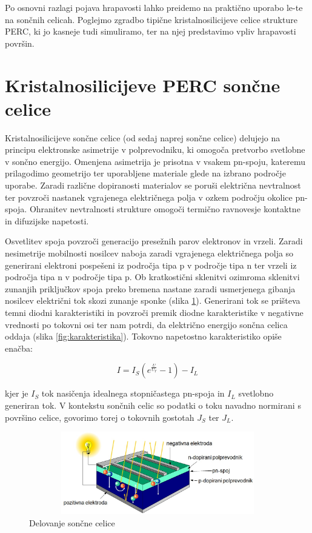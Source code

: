 \documentclass[a4paper,twoside,openright,12pt,slovene]{book}
\begin{document}
Po osnovni razlagi pojava hrapavosti lahko preidemo na praktično uporabo le-te na sončnih celicah. Poglejmo zgradbo tipične kristalnosilicijeve celice strukture PERC, ki jo kasneje tudi simuliramo, ter na njej predstavimo vpliv hrapavosti površin. 


\section{Kristalnosilicijeve PERC sončne celice}
\label{percCelice}
Kristalnosilicijeve sončne celice (od sedaj naprej sončne celice) delujejo na principu elektronske asimetrije v polprevodniku, ki omogoča pretvorbo svetlobne v sončno energijo. Omenjena asimetrija je prisotna v vsakem pn-spoju, kateremu prilagodimo geometrijo ter uporabljene materiale glede na izbrano področje uporabe. Zaradi različne dopiranosti materialov se poruši električna nevtralnost ter povzroči nastanek vgrajenega električnega polja v ozkem področju okolice pn-spoja. Ohranitev nevtralnosti strukture omogoči termično ravnovesje kontaktne in difuzijske napetosti.

Osvetlitev spoja povzroči generacijo presežnih parov elektronov in vrzeli. Zaradi nesimetrije mobilnosti nosilcev naboja zaradi vgrajenega električnega polja so generirani elektroni pospešeni iz področja tipa p v področje tipa n ter vrzeli iz področja tipa n v področje tipa p. Ob kratkostični sklenitvi ozimroma sklenitvi zunanjih priključkov spoja preko bremena nastane zaradi usmerjenega gibanja nosilcev električni tok skozi zunanje sponke (slika \ref{fig:delovanje}). Generirani tok se prišteva temni diodni karakteristiki in povzroči premik diodne karakteristike v negativne vrednosti po tokovni osi ter nam potrdi, da električno energijo sončna celica oddaja (slika \ref{fig:karakteristika}). Tokovno napetostno karakteristiko opiše enačba:

\[I = I_{S}(e^{ \tfrac{U}{U_{T}} } - 1) - I_{L} \]

\noindent kjer je $I_{S}$ tok nasičenja idealnega stopničastega pn-spoja in $I_{L}$ svetlobno generiran tok. V kontekstu sončnih celic so podatki o toku navadno normirani s površino celice, govorimo torej o tokovnih gostotah $J_S$ ter $J_L$.

\begin{figure}[H]
    \centering
    \includegraphics[width=120mm, height=36mm]{Slike/solar_cell.jpg}
    \caption{Delovanje sončne celice \cite{predavanjaopto}}
    \label{fig:delovanje}
\end{figure}
\end{document}
